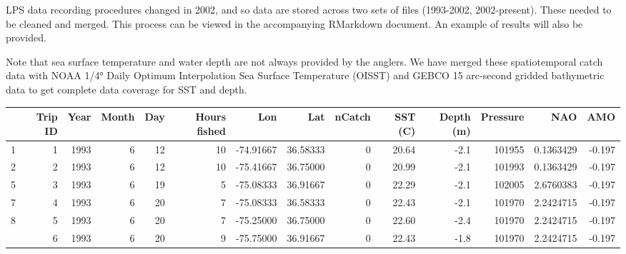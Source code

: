 \documentclass[
]{article}
\let\origtable\table
\let\endorigtable\endtable
\renewenvironment{table}[1][2] {
    \expandafter\origtable\expandafter[H]
} {
    \endorigtable
}
\begin{document}
LPS data recording procedures changed in 2002, and so data are stored across two sets of files (1993-2002, 2002-present). These needed to be cleaned and merged. This process can be viewed in the accompanying RMarkdown document. An example of results will also be provided.

Note that sea surface temperature and water depth are not always provided by the anglers. We have merged these spatiotemporal catch data with NOAA 1/4° Daily Optimum Interpolation Sea Surface Temperature (OISST) and GEBCO 15 arc-second gridded bathymetric data to get complete data coverage for SST and depth.

\begin{landscape}\begin{table}[H]

\caption{\label{tab:mergelps}Table 2: American Large Pelagic Survey example}
\centering
\begin{tabular}[t]{lrrrrrrrrrrrrr}
\toprule
  & Trip
ID & Year & Month & Day & Hours
fished & Lon & Lat & nCatch & SST
(C) & Depth
(m) & Pressure & NAO & AMO\\
\midrule
1 & 1 & 1993 & 6 & 12 & 10 & -74.91667 & 36.58333 & 0 & 20.64 & -2.1 & 101955 & 0.1363429 & -0.197\\
2 & 2 & 1993 & 6 & 12 & 10 & -75.41667 & 36.75000 & 0 & 20.99 & -2.1 & 101993 & 0.1363429 & -0.197\\
5 & 3 & 1993 & 6 & 19 & 5 & -75.08333 & 36.91667 & 0 & 22.29 & -2.1 & 102005 & 2.6760383 & -0.197\\
7 & 4 & 1993 & 6 & 20 & 7 & -75.08333 & 36.58333 & 0 & 22.43 & -2.1 & 101970 & 2.2424715 & -0.197\\
8 & 5 & 1993 & 6 & 20 & 7 & -75.25000 & 36.75000 & 0 & 22.60 & -2.4 & 101970 & 2.2424715 & -0.197\\
\addlinespace
11 & 6 & 1993 & 6 & 20 & 9 & -75.75000 & 36.91667 & 0 & 22.43 & -1.8 & 101970 & 2.2424715 & -0.197\\
\bottomrule
\end{tabular}
\end{table}
\end{landscape}
\end{document}
